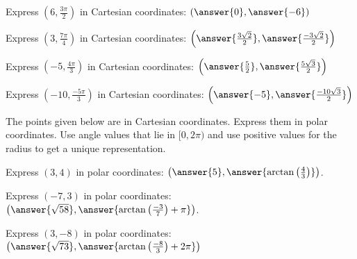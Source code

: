 \documentclass{ximera}
\author{Jason Miller}
\begin{document}
\begin{exercise}


Express $\left( 6, \frac{3\pi}{2}\right)$ in Cartesian coordinates: $\left( \answer{0}, \answer{-6 }\right)$

Express $\left(3, \frac{7 \pi}{4}\right)$ in Cartesian coordinates: $\left( \answer{\frac{3\sqrt{2}}{2}}, \answer{\frac{-3\sqrt{2}}{2}} \right)$

Express $\left( -5, \frac{4\pi}{3} \right)$ in Cartesian coordinates: $\left( \answer{ \frac{5}{2}}, \answer{\frac{5\sqrt{3}}{2}} \right)$

Express $\left( -10, \frac{-5\pi}{3} \right)$ in Cartesian coordinates: $\left( \answer{ -5 },  \answer{ \frac{-10 \sqrt{3}}{2}    }     \right)$

\begin{exercise}

The points given below are in Cartesian coordinates. Express them in polar coordinates. Use angle values that lie in $[0, 2\pi)$ and use positive values for the radius to get a unique representation. 


Express $\left( 3, 4 \right)$ in polar coordinates: $\left( \answer{ 5}, \answer{  \arctan\left( \frac{4}{3}\right) } \right) $. 

Express $\left(-7, 3 \right)$ in polar coordinates: $\left( \answer{ \sqrt{58} } , \answer{  \arctan\left( \frac{-3}{7} \right) + \pi    } \right)$. 

Express $\left(  3  ,  -8   \right)$ in polar coordinates: $\left (  \answer{ \sqrt{73}  }, \answer{\arctan\left( \frac{-8}{3}\right) + 2\pi } \right)$



\end{exercise}
\end{exercise}
\end{document}
